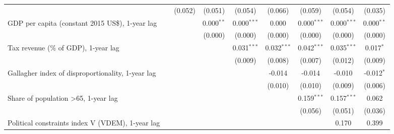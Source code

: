 \begin{table}[htbp]
\begin{tabular}{lcccccccc}
                                                                                                      &                & (0.052)       & (0.051)       & (0.054)       & (0.066)       & (0.059)       & (0.054)       & (0.035)\\   
      GDP per capita (constant 2015 US\$), 1-year lag                                                 &                &               & 0.000$^{**}$  & 0.000$^{***}$ & 0.000         & 0.000$^{***}$ & 0.000$^{***}$ & 0.000$^{**}$\\   
                                                                                                      &                &               & (0.000)       & (0.000)       & (0.000)       & (0.000)       & (0.000)       & (0.000)\\   
      Tax revenue (\% of GDP), 1-year lag                                                             &                &               &               & 0.031$^{***}$ & 0.032$^{***}$ & 0.042$^{***}$ & 0.035$^{***}$ & 0.017$^{*}$\\   
                                                                                                      &                &               &               & (0.009)       & (0.008)       & (0.007)       & (0.012)       & (0.009)\\   
      Gallagher index of disproportionality, 1-year lag                                               &                &               &               &               & -0.014        & -0.014        & -0.010        & -0.012$^{*}$\\   
                                                                                                      &                &               &               &               & (0.010)       & (0.010)       & (0.009)       & (0.006)\\   
      Share of population >65, 1-year lag                                                             &                &               &               &               &               & 0.159$^{***}$ & 0.157$^{***}$ & 0.062\\   
                                                                                                      &                &               &               &               &               & (0.056)       & (0.051)       & (0.036)\\   
      Political constraints index V (VDEM), 1-year lag                                                &                &               &               &               &               &               & 0.170         & 0.399\\   

\end{tabular}
\end{table}

